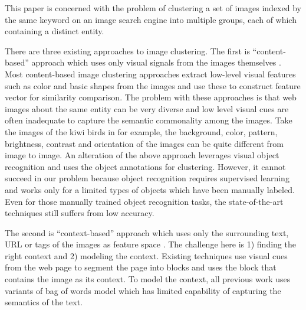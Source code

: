 
This paper is concerned with the problem of clustering a set of
images indexed by the same keyword on an image search engine into
multiple groups, each of which containing a distinct entity.

There are three existing approaches to image clustering. The first is
``content-based'' approach which uses only visual signals from
the images themselves \cite{ZhongLL11}.
Most content-based image clustering 
approaches extract low-level visual features such as color and basic shapes
from the images and use these to construct feature vector for similarity
comparison. 
The problem with these approaches is that web images about the same entity
can be very diverse and low level visual cues are often inadequate to
capture the semantic commonality among the images. Take the images of
the kiwi birds in  for example,
the background, color, pattern, brightness, contrast and
orientation of the images can be quite different from image to image.
An alteration of the above approach leverages visual object 
recognition and uses the object annotations for clustering.
However, it cannot succeed in our problem because
object recognition requires supervised learning and works only for a limited
types of objects which have been manually labeled. Even for those
manually trained object recognition tasks, the
state-of-the-art techniques \cite{Li09scene} still suffers from
low accuracy.

The second is ``context-based'' approach which uses only the surrounding
text, URL or tags of the images as feature space \cite{Cai2004b}. %
The challenge here is
1) finding the right context and 2) modeling the context. Existing
techniques use visual cues from the web page to segment the page into
blocks and uses the block that contains the image as its context. To model
the context, all previous work uses variants of bag of words model which
has limited capability of capturing the semantics of the text.

